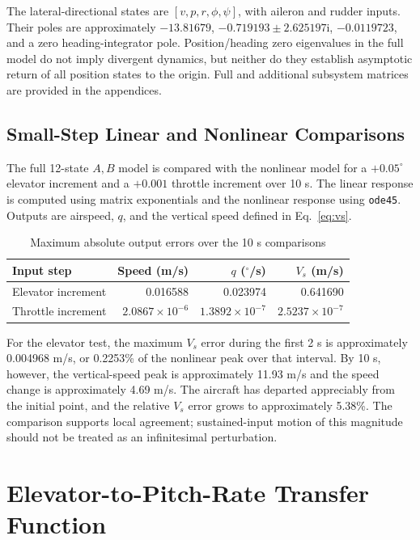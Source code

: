 \documentclass[a4paper,11pt]{article}
\begin{document}
The lateral-directional states are $[v,p,r,\phi,\psi]$, with aileron and rudder inputs. Their poles are approximately $-13.81679$, $-0.719193\pm2.625197\mathrm i$, $-0.0119723$, and a zero heading-integrator pole. Position/heading zero eigenvalues in the full model do not imply divergent dynamics, but neither do they establish asymptotic return of all position states to the origin. Full and additional subsystem matrices are provided in the appendices.

\subsection{Small-Step Linear and Nonlinear Comparisons}
The full 12-state $A,B$ model is compared with the nonlinear model for a $+0.05^\circ$ elevator increment and a $+0.001$ throttle increment over 10 s. The linear response is computed using matrix exponentials and the nonlinear response using \texttt{ode45}. Outputs are airspeed, $q$, and the vertical speed defined in Eq.~\eqref{eq:vs}.
\begin{table}[H]\centering
\caption{Maximum absolute output errors over the 10 s comparisons}
\begin{tabular}{lrrr}\toprule
Input step&Speed (m/s)&$q$ ($^\circ$/s)&$V_s$ (m/s)\\\midrule
Elevator increment&0.016588&0.023974&0.641690\\
Throttle increment&$2.0867\times10^{-6}$&$1.3892\times10^{-7}$&$2.5237\times10^{-7}$\\\bottomrule
\end{tabular}
\end{table}
For the elevator test, the maximum $V_s$ error during the first 2 s is approximately 0.004968 m/s, or 0.2253\% of the nonlinear peak over that interval. By 10 s, however, the vertical-speed peak is approximately 11.93 m/s and the speed change is approximately 4.69 m/s. The aircraft has departed appreciably from the initial point, and the relative $V_s$ error grows to approximately 5.38\%. The comparison supports local agreement; sustained-input motion of this magnitude should not be treated as an infinitesimal perturbation.

\section{Elevator-to-Pitch-Rate Transfer Function}
\end{document}
